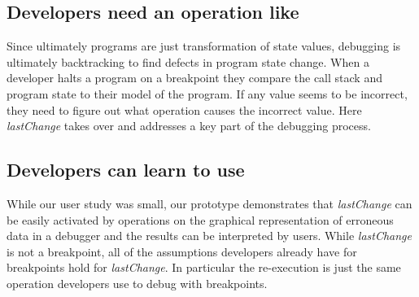 \documentclass{sig-alternate}
\begin{document}
\subsection{Developers need an operation like  }


Since ultimately programs are just
transformation of state values, debugging is ultimately backtracking
to find defects in program state change\cite{Weiser,Zeller}.  When a developer halts a
program on a breakpoint they compare the call stack and program state to their model of the program.
If any value seems to be incorrect,  they need to figure out what operation
causes the incorrect value. Here \textit{lastChange} takes over and addresses a key
part of the debugging process.

\subsection{Developers can learn to use }

While our user study was small, our prototype demonstrates that
\textit{lastChange} can be easily activated by operations on the
graphical representation of erroneous data in a debugger and the 
results can be interpreted by users. 
While \textit{lastChange} is not a breakpoint, 
all of the assumptions developers already have for breakpoints hold
for \textit{lastChange}. In particular the re-execution is just the
same operation developers use to debug with breakpoints. 
\end{document}
